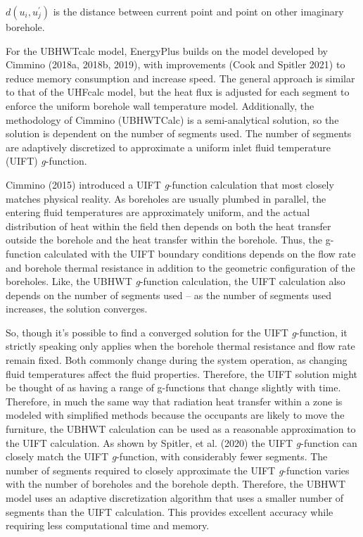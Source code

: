 \(d(u_i, u_j^{'})\) is the distance between current point and point on other imaginary borehole.

For the UBHWTcalc model, EnergyPlus builds on the model developed by Cimmino (2018a, 2018b, 2019), with improvements (Cook and Spitler 2021) to reduce memory consumption and increase speed. The general approach is similar to that of the UHFcalc model, but the heat flux is adjusted for each segment to enforce the uniform borehole wall temperature model. Additionally, the methodology of Cimmino (UBHWTCalc) is a semi-analytical solution, so the solution is dependent on the number of segments used. The number of segments are adaptively discretized to approximate a uniform inlet fluid temperature (UIFT) \emph{g}-function. 

Cimmino (2015) introduced a UIFT \emph{g}-function calculation that most closely matches physical reality. As boreholes are usually plumbed in parallel, the entering fluid temperatures are approximately uniform, and the actual distribution of heat within the field then depends on both the heat transfer outside the borehole and the heat transfer within the borehole. Thus, the g-function calculated with the UIFT boundary conditions depends on the flow rate and borehole thermal resistance in addition to the geometric configuration of the boreholes. Like, the UBHWT \emph{g}-function calculation, the UIFT calculation also depends on the number of segments used – as the number of segments used increases, the solution converges. 

So, though it’s possible to find a converged solution for the UIFT \emph{g}-function, it strictly speaking only applies when the borehole thermal resistance and flow rate remain fixed. Both commonly change during the system operation, as changing fluid temperatures affect the fluid properties. Therefore, the UIFT solution might be thought of as having a range of g-functions that change slightly with time. Therefore, in much the same way that radiation heat transfer within a zone is modeled with simplified methods because the occupants are likely to move the furniture, the UBHWT calculation can be used as a reasonable approximation to the UIFT calculation. As shown by Spitler, et al. (2020) the UIFT \emph{g}-function can closely match the UIFT \emph{g}-function, with considerably fewer segments. The number of segments required to closely approximate the UIFT \emph{g}-function varies with the number of boreholes and the borehole depth. Therefore, the UBHWT model uses an adaptive discretization algorithm that uses a smaller number of segments than the UIFT calculation. This provides excellent accuracy while requiring less computational time and memory. 

